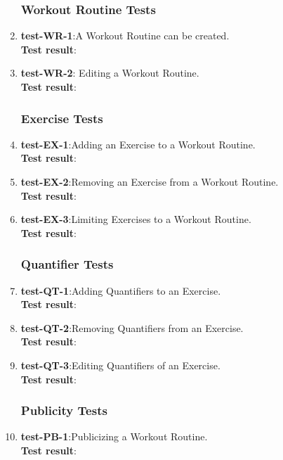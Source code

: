 \documentclass[12pt, titlepage]{article}
\begin{document}
\begin{enumerate}
	
\subsubsection{Workout Routine Tests}
	\item{\textbf{test-WR-1}}:A Workout Routine can be created.\\
	\textbf{Test result}:
	
	\item{\textbf{test-WR-2}}: Editing a Workout Routine.\\
	\textbf{Test result}:
	
\subsubsection{Exercise Tests}
	\item{\textbf{test-EX-1}}:Adding an Exercise to a Workout Routine.\\
	\textbf{Test result}:
	
	\item{\textbf{test-EX-2}}:Removing an Exercise from a Workout Routine.\\
	\textbf{Test result}:
	
	\item{\textbf{test-EX-3}}:Limiting Exercises to a Workout Routine.\\
	\textbf{Test result}:
	
\subsubsection{Quantifier Tests}
	\item{\textbf{test-QT-1}}:Adding Quantifiers to an Exercise.\\
	\textbf{Test result}:
	
	\item{\textbf{test-QT-2}}:Removing Quantifiers from an Exercise.\\
	\textbf{Test result}:
	
	\item{\textbf{test-QT-3}}:Editing Quantifiers of an Exercise.\\
	\textbf{Test result}:
	
\subsubsection{Publicity Tests}
	\item{\textbf{test-PB-1}}:Publicizing a Workout Routine.\\
	\textbf{Test result}:
	

\end{enumerate}
\end{document}
